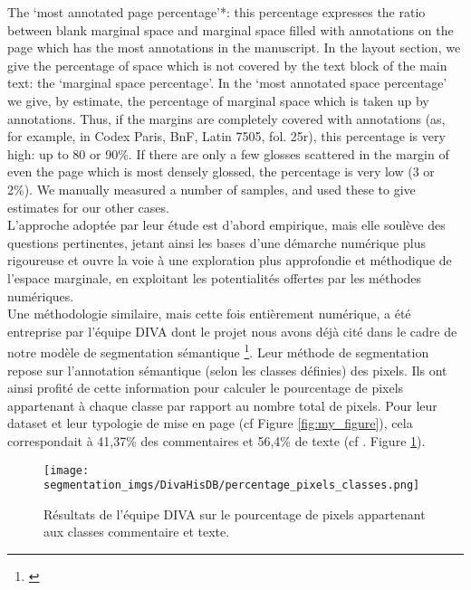 \documentclass[a4paper, twoside, 12pt]{book}
\begin{document}
{\og{} The ‘most annotated page percentage’*: this percentage expresses the ratio between blank marginal space and marginal space filled with annotations on the page which has the most annotations in the manuscript. In the layout section, we give the percentage of space which is not covered by the text block of the main text: the ‘marginal space percentage’. In the ‘most annotated space percentage’ we give, by estimate, the percentage of marginal space which is taken up by annotations. Thus, if the margins are completely covered with annotations (as, for example, in Codex Paris, BnF, Latin 7505, fol. 25r), this percentage is very high: up to 80 or 90\%. If there are only a few glosses scattered in the margin of even the page which is most densely glossed, the percentage is very low (3 or 2\%). We manually measured a number of samples, and used these to give estimates for our other cases. \fg{}\\ 


L'approche adoptée par leur étude est d'abord empirique, mais elle soulève des questions pertinentes, jetant ainsi les bases d'une démarche numérique plus rigoureuse et ouvre la voie à une exploration plus approfondie et méthodique de \og{}l'espace marginale\fg{}, en exploitant les potentialités offertes par les méthodes numériques.\\

Une méthodologie similaire, mais cette fois entièrement numérique, a été entreprise par l'équipe DIVA dont le projet nous avons déjà cité dans le cadre de notre modèle de segmentation sémantique \footnote{\cite{simistira2016diva}}. Leur méthode de segmentation repose sur l'annotation sémantique (selon les classes définies) des pixels. Ils ont ainsi profité de cette information pour calculer le pourcentage de pixels appartenant à chaque classe par rapport au nombre total de pixels. Pour leur dataset et leur typologie de mise en page (cf Figure \ref{fig:my_figure}), cela correspondait à 41,37\% des commentaires et 56,4\% de texte (cf . Figure \ref{fig:pixel_diva}). \\

\begin{figure}[H]
    \centering
    \texttt{[image: segmentation\_imgs/DivaHisDB/percentage\_pixels\_classes.png]}
    \caption{Résultats de l'équipe DIVA sur le pourcentage de pixels appartenant aux classes \og{}commentaire\fg{} et \og{}texte\fg{}.}
    \label{fig:pixel_diva}
\end{figure}

}
\end{document}
